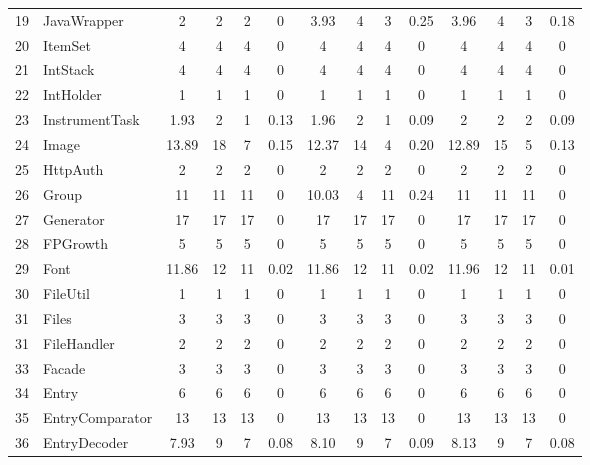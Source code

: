 \documentclass[conference]{IEEEtran}
\begin{document}
\begin{table} [ht]
{\begin{tabular}{|c|l|c|c|c|c|c|c|c|c|c|c|c|c|}
 19						& JavaWrapper					& 2	&	2	&	2	& 		0					& 3.93	& 4 		& 3		& 		0.25			& 3.96		& 4			& 3			&	0.18\\      
 20						& ItemSet						& 4	&	4	&	4	& 		0					& 4		& 4 		& 4		& 		0			& 4			& 4			& 4			&	0\\      
 21						& IntStack						& 4	&	4	&	4	& 		0					& 4		& 4 		& 4		& 		0			& 4			& 4			& 4			&	0\\      
 22						& IntHolder					& 1	&	1	&	1	& 		0					& 1		& 1 		& 1		& 		0			& 1			& 1			& 1			&	0\\      
 23						& InstrumentTask				& 1.93&	2	&	1	& 		0.13					& 1.96	& 2 		& 1		& 		0.09			& 2			& 2			& 2			&	0.09\\      
 24						& Image						& 13.89&	18	&	7	& 		0.15					& 12.37	& 14 		& 4		& 		0.20			& 12.89		& 15			& 5			&	0.13\\      
 25						& HttpAuth					& 2	&	2	&	2	& 		0					& 2		& 2 		& 2		& 		0			& 2			& 2			& 2			&	0\\      
 26						& Group						& 11	&	11	&	11	& 		0					& 10.03	& 4 		& 11		& 		0.24			& 11			& 11			& 11			&	0\\      
 27						& Generator					& 17	&	17	&	17	& 		0					& 17		& 17 		& 17		& 		0			& 17			& 17			& 17			&	0\\      
 28						& FPGrowth					& 5	&	5	&	5	& 		0					& 5		&  5		& 5		& 		0			& 5			& 5			& 5			&	0\\      
 29						& Font						& 11.86&	12	&	11	& 		0.02					& 11.86	& 12 		& 11		& 		0.02			& 11.96		& 12			& 11			&	0.01\\      
 30						& FileUtil						& 1	&	1	&	1	& 		0					& 1		& 1 		& 1		& 		0			& 1			& 1			& 1			&	0\\      
 31						& Files						& 3	&	3	&	3	& 		0					& 3		& 3 		& 3		& 		0			& 3			& 3			& 3			&	0\\      
 31						& FileHandler					& 2	&	2	&	2	& 		0					& 2		& 2 		& 2		& 		0			& 2			& 2			& 2			&	0\\      
 33						& Facade						& 3	&	3	&	3	& 		0					& 3		& 3 		& 3		& 		0			& 3			& 3			& 3			&	0\\      
 34						& Entry						& 6	&	6	&	6	& 		0					& 6		& 6 		& 6		& 		0			& 6			& 6			& 6			&	0\\      
 35						& EntryComparator				& 13	&	13	&	13	& 		0					& 13		& 13 		& 13		& 		0			& 13			& 13			& 13			&	0\\      
 36						& EntryDecoder				& 7.93&	9	&	7	& 		0.08					& 8.10	& 9 		& 7		& 		0.09			& 8.13		& 9			& 7			&	0.08\\ 

\end{tabular}}
\end{table}
\end{document}
